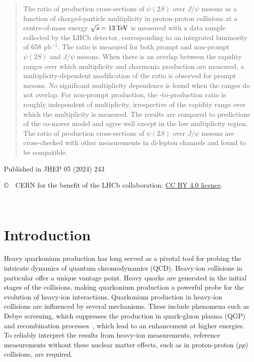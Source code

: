 \documentclass[12pt,a4paper]{article}
\def\papercopyright{\the\year\ CERN for the benefit of the LHCb collaboration}
\def\paperlicence{CC BY 4.0 licence}
\def\paperlicenceurl{https://creativecommons.org/licenses/by/4.0/}
\begin{document}
\begin{titlepage}
\begin{abstract}
  \noindent
  The ratio of production cross-sections of $\psi(2S)$ over $J/\psi$ mesons as a function of charged-particle multiplicity in proton-proton collisions at a centre-of-mass energy \mbox{$\sqrt{s}=13 \text{\,Te\kern -0.1em V}$} is measured with a data sample collected by the LHCb detector, corresponding to an integrated luminosity of 658 pb$^{-1}$. The ratio is measured for both prompt and non-prompt $\psi(2S)$ and $J/\psi$ mesons. When there is an overlap between the rapidity ranges over which multiplicity and charmonia production are measured, a multiplicity-dependent modification of the ratio is observed for prompt mesons. No significant multiplicity dependence is found when the ranges do not overlap. For non-prompt production, the \psitwos-to-\jpsi production ratio is roughly independent of multiplicity, irrespective of the rapidity range over which the multiplicity is measured.
  The results are compared to predictions of the co-mover model and agree well except in the low multiplicity region. The ratio of production cross-sections of $\psi(2S)$ over $J/\psi$ mesons are cross-checked with other measurements in di-lepton channels and found to be compatible.
\end{abstract}
\vspace*{2.0cm}
\begin{center}
Published in JHEP 05 (2024) 243
\end{center}
{\footnotesize 
\centerline{\copyright~\papercopyright. \href{\paperlicenceurl}{\paperlicence}.}}
\vspace*{2mm}
\vspace{\fill}
\end{titlepage}
\newpage
\setcounter{page}{2}
\mbox{~}
\renewcommand{\thefootnote}{\arabic{footnote}}
\setcounter{footnote}{0}
\cleardoublepage
\pagestyle{plain}
\setcounter{page}{1}
\newpage



\section{Introduction}
\label{sec:Introduction}
Heavy quarkonium production has long served as a pivotal tool for probing the intricate dynamics of quantum chromodynamics (QCD). Heavy-ion collisions in particular offer a unique vantage point. Heavy quarks are generated in the initial stages of the collisions, making quarkonium production a powerful probe for the evolution of heavy-ion interactions. Quarkonium production in heavy-ion collisions are influenced by several mechanisms. These include phenomena such as Debye screening, which suppresses the production in quark-gluon plasma (QGP)\cite{MATSUI1986416} and recombination processes~\cite{Zhao:2020jqu}, which lead to an enhancement at higher energies\cite{Thews:2000rj}. To reliably interpret the results from heavy-ion measurements, reference measurements without these nuclear matter effects, such as in proton-proton ($pp$) collisions, are required.
\end{document}
